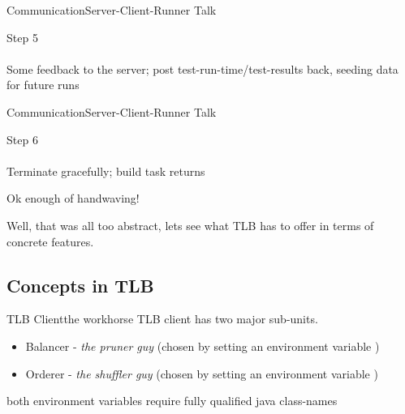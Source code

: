 \documentclass{beamer}
\begin{document}
\begin{frame}{Communication}{Server-Client-Runner Talk}
  \begin{multicols}{2}
    \begin{centering}
    \end{centering}
    \begin{center}
      {\huge Step 5}\\
      \quad\\
          {\large Some feedback to the server; post test-run-time/test-results back, seeding data for future runs}
    \end{center}
  \end{multicols}
\end{frame}


\begin{frame}{Communication}{Server-Client-Runner Talk}
  \begin{multicols}{2}
    \begin{centering}
    \end{centering}
    \begin{center}
      {\huge Step 6}\\
      \quad\\
          {\large Terminate gracefully; build task returns}
    \end{center}
  \end{multicols}
\end{frame}

\begin{frame}{Ok enough of handwaving!}
  \begin{center}
    Well, that was all too abstract, lets see what TLB has to offer in terms of concrete features.
  \end{center}
\end{frame}

\subsection{Concepts in TLB}

\begin{frame}{TLB Client}{the workhorse}
  TLB client has two major sub-units.
  \pause
  \quad\\
  \begin{itemize}
  \item Balancer - \emph{the pruner guy} ({\small chosen by setting an environment variable })
    \quad\\
    \pause
  \item Orderer - \emph{the shuffler guy} ({\small chosen by setting an environment variable })
  \end{itemize}
  {\tiny both environment variables require fully qualified java class-names}
\end{frame}
\end{document}
